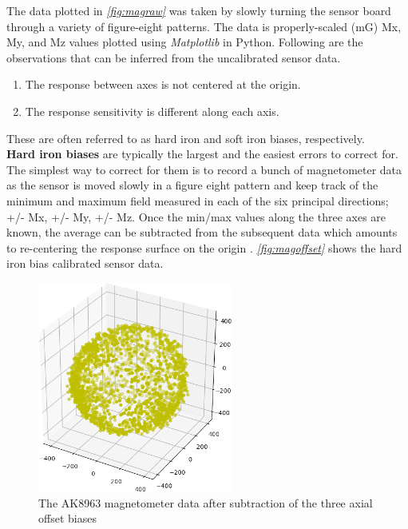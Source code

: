 \documentclass[a4paper,12pt,oneside]{book}
\begin{document}
The data plotted in \textit{\autoref{fig:magraw}} was taken by slowly turning the sensor board through a variety of figure-eight patterns. The data is properly-scaled (mG) Mx, My, and Mz values plotted using \textit{Matplotlib} in Python. Following are the observations that can be inferred from the uncalibrated sensor data.\\

\begin{enumerate}
\item The response between axes is not centered at the origin.
\item The response sensitivity is different along each axis. 
\end{enumerate}

These are often referred to as hard iron and soft iron biases, respectively.\\

\textbf{Hard iron biases} are typically the largest and the easiest errors to correct for. The simplest way to correct for them is to record a bunch of magnetometer data as the sensor is moved slowly in a figure eight pattern and keep track of the minimum and maximum field measured in each of the six principal directions; +/- Mx, +/- My, +/- Mz. Once the min/max values along the three axes are known, the average can be subtracted from the subsequent data which amounts to re-centering the response surface on the origin \cite{kris}. \textit{\autoref{fig:magoffset}} shows the hard iron bias calibrated sensor data.\\

\begin{figure}[!htb]
\centering
\includegraphics[width=0.57\textwidth]{images/offset}
\caption{The AK8963 magnetometer data after subtraction of the three axial offset biases}
\label{fig:magoffset}
\end{figure}
\end{document}
